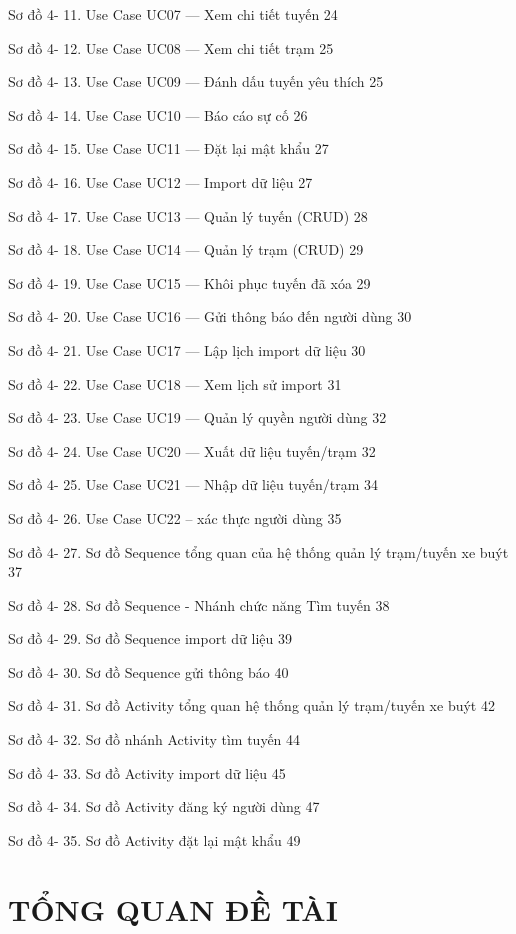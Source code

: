 \documentclass[13pt,a4paper]{report}
\begin{document}
Sơ đồ 4- 11. Use Case UC07 — Xem chi tiết tuyến	24

Sơ đồ 4- 12. Use Case UC08 — Xem chi tiết trạm	25

Sơ đồ 4- 13. Use Case UC09 — Đánh dấu tuyến yêu thích	25

Sơ đồ 4- 14. Use Case UC10 — Báo cáo sự cố	26

Sơ đồ 4- 15. Use Case UC11 — Đặt lại mật khẩu	27

Sơ đồ 4- 16. Use Case UC12 — Import dữ liệu	27

Sơ đồ 4- 17. Use Case UC13 — Quản lý tuyến (CRUD)	28

Sơ đồ 4- 18. Use Case UC14 — Quản lý trạm (CRUD)	29

Sơ đồ 4- 19. Use Case UC15 — Khôi phục tuyến đã xóa	29

Sơ đồ 4- 20. Use Case UC16 — Gửi thông báo đến người dùng	30

Sơ đồ 4- 21. Use Case UC17 — Lập lịch import dữ liệu	30

Sơ đồ 4- 22. Use Case UC18 — Xem lịch sử import	31

Sơ đồ 4- 23.  Use Case UC19 — Quản lý quyền người dùng	32

Sơ đồ 4- 24. Use Case UC20 — Xuất dữ liệu tuyến/trạm	32

Sơ đồ 4- 25. Use Case UC21 — Nhập dữ liệu tuyến/trạm	34

Sơ đồ 4- 26. Use Case UC22  -- xác thực người dùng	35

Sơ đồ 4- 27. Sơ đồ Sequence tổng quan của hệ thống quản lý trạm/tuyến xe buýt	37

Sơ đồ 4- 28. Sơ đồ Sequence - Nhánh chức năng Tìm tuyến	38

Sơ đồ 4- 29. Sơ đồ Sequence import dữ liệu	39

Sơ đồ 4- 30. Sơ đồ Sequence gửi thông báo	40

Sơ đồ 4- 31. Sơ đồ Activity tổng quan hệ thống quản lý trạm/tuyến xe buýt	42

Sơ đồ 4- 32. Sơ đồ nhánh  Activity tìm tuyến	44

Sơ đồ 4- 33. Sơ đồ Activity import dữ liệu	45

Sơ đồ 4- 34. Sơ đồ Activity đăng ký người dùng	47

Sơ đồ 4- 35. Sơ đồ Activity đặt lại mật khẩu	49

\chapter{TỔNG QUAN ĐỀ TÀI}
\end{document}
